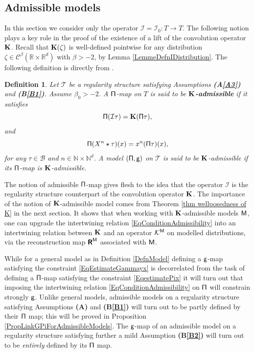 \documentclass[10pt, reqno]{amsart}
\numberwithin{subsection}{section}
\numberwithin{subsubsection}{subsection}
\numberwithin{equation}{section} %
\theoremstyle{mystyle}
\theoremstyle{mystyle2}
\newtheorem*{defn*} {Definition}
\theoremstyle{mystyle3}
\newcommand{\refA}[1]{\textbf{\textsf{(A\ref{#1})}}}
\newcommand{\REFA}{\textbf{\textsf{(A)}}}
\newcommand{\refB}[1]{\textbf{\textsf{(B\ref{#1})}}}
\newcommand\bbN{\mathbb{N}}
\newcommand\bbR{\mathbb{R}}
\newcommand{\mcB}{\mathcal{B}}
\newcommand{\mcC}{\mathcal{C}}
\newcommand{\mcI}{\mathcal{I}}
\newcommand{\mcK}{\mathcal{K}}
\begin{document}
\bigskip


\subsection{Admissible models}
\label{SubsectionAdmissible}

In this section we consider only the operator $\mcI=\mcI_0:T\to T$. The following notion plays a key role in the proof of the existence of a lift of the convolution operator $\bf K$. Recall that ${\bf K}(\zeta)$ is well-defined pointwise for any distribution $\zeta\in\mcC^\beta(\bbR\times\bbR^d)$ with $\beta>-2$, by Lemma \ref{LemmeDefnIDistribution}. The following definition is directly from \cite[Definition 6.9]{BHZ}.

\medskip

\begin{defn*}
Let $\mathscr{T}$ be a regularity structure satisfying Assumptions \refA{A3} and \refB{B1}. Assume $\beta_0>-2$. A ${\sf \Pi}$-map on $T$ is said to be \textbf{\textsf{${\bf K}$-admissible}} if it satisfies 
\begin{equation} \label{EqConditionAdmissibility} 
{\sf \Pi}(\mcI\tau) = {\bf K}({\sf \Pi}\tau),
\end{equation}
and
\begin{equation} \label{EqConditionAdmissibility2} 
{\sf \Pi}(X^n\star\tau)(x) = x^n({\sf \Pi}\tau)(x),
\end{equation}
for any $\tau\in\mcB$ and $n\in\bbN\times\bbN^d$. A model $({\sf\Pi},{\sf 
g})$ on $\mathscr{T}$ is said to be ${\bf K}$-admissible if its $\sf \Pi$-map is ${\bf K}$-admissible.
\end{defn*}

\medskip

The notion of admissible $\sf \Pi$-map gives flesh to the idea that the operator $\mcI$ is the regularity structure counterpart of the convolution 
operator ${\bf K}$. The importance of the notion of $\bf K$-admissible model comes from Theorem \ref{thm wellposedness of K} in the next section. It shows that when working with $\bf K$-admissible models $\sf M$, one can upgrade the intertwining relation  \eqref{EqConditionAdmissibility} into an intertwining relation between $\bf K$ and an operator $\mcK^{\sf M}$ 
on modelled distributions, via the reconstruction map $\textbf{\textsf{R}}^{\sf M}$ associated with $\sf M$. 

While for a general model as in Definition \ref{DefnModel} defining a $\sf g$-map satisfying the constraint \eqref{EqEstimateGammayx} is decorrelated from the task of defining a $\sf \Pi$-map satisfying the constraint \eqref{EqestimatePix} it will turn out that imposing the intertwining relation \eqref{EqConditionAdmissibility} on $\sf \Pi$ will constrain strongly $\sf g$. Unlike general models, admissible models on a regularity structure satisfying Assumptions {\REFA} and \refB{B1} will turn out to be partly defined by their $\sf\Pi$ map; this will be proved in Proposition \ref{PropLinkGPiForAdmissibleModels}. The $\sf g$-map of an admissible model on a regularity structure satisfying further a mild Assumption \refB{B2} will turn out to be {\it entirely} defined by its $\sf\Pi$ map.
\end{document}
